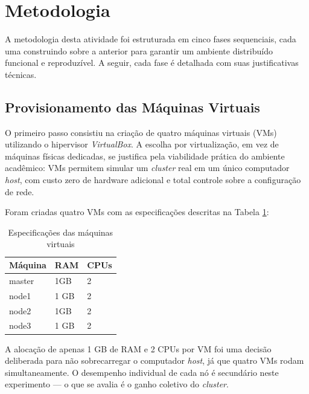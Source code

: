 \documentclass[
	12pt,
	oneside,
	a4paper,
	chapter=TITLE,
	section=TITLE,
	english,
	brazil,
	sumario=tradicional
]{abntex2}
\begin{document}
\section{Metodologia}

A metodologia desta atividade foi estruturada em cinco fases sequenciais, cada uma construindo sobre a anterior para garantir um ambiente distribuído funcional e reproduzível. A seguir, cada fase é detalhada com suas justificativas técnicas.

\subsection{Provisionamento das Máquinas Virtuais}

O primeiro passo consistiu na criação de quatro máquinas virtuais (VMs) utilizando o hipervisor \textit{VirtualBox}. A escolha por virtualização, em vez de máquinas físicas dedicadas, se justifica pela viabilidade prática do ambiente acadêmico: VMs permitem simular um \textit{cluster} real em um único computador \textit{host}, com custo zero de hardware adicional e total controle sobre a configuração de rede.

Foram criadas quatro VMs com as especificações descritas na Tabela \ref{tab:especificacoes}:

\begin{table}[H]
    \centering
    \caption{Especificações das máquinas virtuais}
    \begin{tabular}{|l|l|l|}
        \hline

        \rowcolor{gray!25} 
        \textbf{Máquina} & \textbf{RAM} & \textbf{CPUs} \\ 
        \hline
        
        master & 1GB & 2 \\ 
        \hline
        node1 & 1 GB & 2  \\ 
        \hline
        node2 & 1GB & 2  \\ 
        \hline
        node3 & 1 GB & 2  \\ 
        \hline
    \end{tabular}
    
    \label{tab:especificacoes}
\end{table}

A alocação de apenas 1 GB de RAM e 2 CPUs por VM foi uma decisão deliberada para não sobrecarregar o computador \textit{host}, já que quatro VMs rodam simultaneamente. O desempenho individual de cada nó é secundário neste experimento — o que se avalia é o ganho coletivo do \textit{cluster}.
\end{document}
